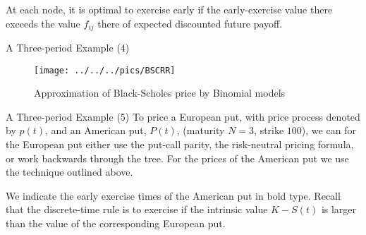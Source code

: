 	At each node, it is optimal to exercise early if the
	early-exercise value there exceeds the value $f_{ij}$ there of
	expected discounted future payoff.


 A Three-period Example (4)
	\begin{figure}[htb]
	\begin{center}
		\texttt{[image: ../../../pics/BSCRR]}
	\caption{Approximation of Black-Scholes price by Binomial models}
	\end{center}\label{BSCRR}
	\end{figure}




A Three-period Example (5)
	To price a European put, with price process denoted by $p(t)$, and
	an American put, $P(t)$, (maturity $N=3$, strike $100$), we can
	for the European put either use the put-call parity, the risk-neutral pricing formula, or work
	backwards through the tree. For the prices of the American put we
	use the technique outlined above.
	
	We indicate the early exercise times of the American put in bold
	type. Recall that the discrete-time rule is to exercise if the
	intrinsic value $K-S(t)$ is larger than the value of the
	corresponding European put.


